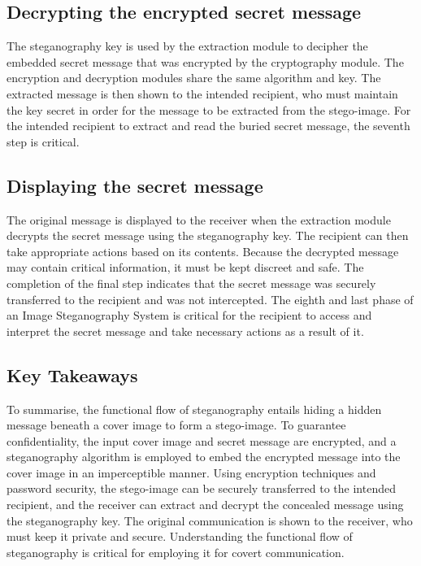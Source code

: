 \subsection{Decrypting the encrypted secret message}
The steganography key is used by the extraction module to decipher the embedded secret message that was encrypted by the cryptography module. The encryption and decryption modules share the same algorithm and key. The extracted message is then shown to the intended recipient, who must maintain the key secret in order for the message to be extracted from the stego-image. For the intended recipient to extract and read the buried secret message, the seventh step is critical.

\subsection{Displaying the secret message}
The original message is displayed to the receiver when the extraction module decrypts the secret message using the steganography key. The recipient can then take appropriate actions based on its contents. Because the decrypted message may contain critical information, it must be kept discreet and safe. The completion of the final step indicates that the secret message was securely transferred to the recipient and was not intercepted. The eighth and last phase of an Image Steganography System is critical for the recipient to access and interpret the secret message and take necessary actions as a result of it.

\subsection{Key Takeaways}
To summarise, the functional flow of steganography entails hiding a hidden message beneath a cover image to form a stego-image. To guarantee confidentiality, the input cover image and secret message are encrypted, and a steganography algorithm is employed to embed the encrypted message into the cover image in an imperceptible manner. Using encryption techniques and password security, the stego-image can be securely transferred to the intended recipient, and the receiver can extract and decrypt the concealed message using the steganography key. The original communication is shown to the receiver, who must keep it private and secure. Understanding the functional flow of steganography is critical for employing it for covert communication.